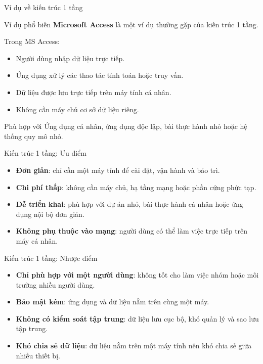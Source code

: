 \documentclass[aspectratio=169,11pt]{beamer}
\newcommand{\keyword}[1]{\textcolor{accent}{\textbf{#1}}}
\newcommand{\tightlist}{\setlength{\itemsep}{2pt}\setlength{\parskip}{0pt}}
\begin{document}
\begin{frame}{Ví dụ về kiến trúc 1 tầng}
\small
\begin{block}{Ví dụ phổ biến}
\keyword{Microsoft Access} là một ví dụ thường gặp của kiến trúc 1 tầng.
\end{block}

Trong MS Access:
\begin{itemize}
\tightlist
  \item Người dùng nhập dữ liệu trực tiếp.
  \item Ứng dụng xử lý các thao tác tính toán hoặc truy vấn.
  \item Dữ liệu được lưu trực tiếp trên máy tính cá nhân.
  \item Không cần máy chủ cơ sở dữ liệu riêng.
\end{itemize}

\begin{exampleblock}{Phù hợp với}
Ứng dụng cá nhân, ứng dụng độc lập, bài thực hành nhỏ hoặc hệ thống quy mô nhỏ.
\end{exampleblock}
\end{frame}

\begin{frame}{Kiến trúc 1 tầng: Ưu điểm}
\small
\begin{itemize}
\tightlist
  \item \keyword{Đơn giản}: chỉ cần một máy tính để cài đặt, vận hành và bảo trì.
  \item \keyword{Chi phí thấp}: không cần máy chủ, hạ tầng mạng hoặc phần cứng phức tạp.
  \item \keyword{Dễ triển khai}: phù hợp với dự án nhỏ, bài thực hành cá nhân hoặc ứng dụng nội bộ đơn giản.
  \item \keyword{Không phụ thuộc vào mạng}: người dùng có thể làm việc trực tiếp trên máy cá nhân.
\end{itemize}
\end{frame}

\begin{frame}{Kiến trúc 1 tầng: Nhược điểm}
\small
\begin{itemize}
\tightlist
  \item \keyword{Chỉ phù hợp với một người dùng}: không tốt cho làm việc nhóm hoặc môi trường nhiều người dùng.
  \item \keyword{Bảo mật kém}: ứng dụng và dữ liệu nằm trên cùng một máy.
  \item \keyword{Không có kiểm soát tập trung}: dữ liệu lưu cục bộ, khó quản lý và sao lưu tập trung.
  \item \keyword{Khó chia sẻ dữ liệu}: dữ liệu nằm trên một máy tính nên khó chia sẻ giữa nhiều thiết bị.
\end{itemize}
\end{frame}
\end{document}
